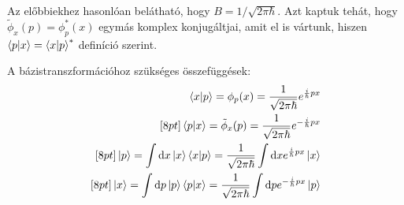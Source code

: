 Az előbbiekhez hasonlóan belátható, hogy $B=1/\sqrt{2\pi\hbar}$. Azt kaptuk tehát, hogy $\tilde\phi_x(p) = \phi^{*}_p(x)$ egymás komplex konjugáltjai,
amit el is vártunk, hiszen $\braket{p|x}=\braket{x|p}^{*}$ definíció szerint.

A bázistranszformációhoz szükséges összefüggések:
\begin{eqnarray}
    \braket{x|p} = \phi_p(x) = \frac{1}{\sqrt{2\pi\hbar}}e^{\frac{i}{\hbar}px} \\ [8pt]
    \braket{p|x} = \tilde\phi_x(p) = \frac{1}{\sqrt{2\pi\hbar}}e^{-\frac{i}{\hbar}px} \\ [8pt]
    \ket p = \int\textrm{d} x \ket x \braket{x|p} = \frac{1}{\sqrt{2\pi\hbar}} \int\textrm{d} x e^{\frac{i}{\hbar}px} \ket x \\ [8pt]
    \ket x = \int\textrm{d} p \ket p \braket{p|x} = \frac{1}{\sqrt{2\pi\hbar}} \int\textrm{d} p e^{-\frac{i}{\hbar}px} \ket p \\
\end{eqnarray}


